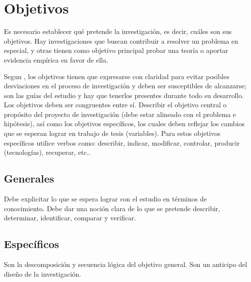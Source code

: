 




\section{Objetivos}
Es necesario establecer qué pretende la investigación, es decir, cuáles son sus objetivos. Hay investigaciones que buscan contribuir a resolver un problema en especial, y otras tienen como objetivo principal probar una teoría o aportar evidencia empírica en favor de ella. \par 
\vskip 0.3cm
Segun \cite{Rojas}, los objetivos tienen que expresarse con claridad para evitar posibles desviaciones en el proceso de investigación y deben ser susceptibles de alcanzarse; son las guías del estudio y hay que tenerlos presentes durante todo su desarrollo. Los objetivos deben ser congruentes entre sí.
\vskip 0.3cm
Describir el objetivo central o propósito del proyecto de investigación (debe estar alineado con el problema e hipótesis), así como los objetivos específicos, los cuales deben reflejar los cambios que se esperan lograr en trabajo de tesis (variables). Para estos objetivos específicos utilice verbos como: describir, indicar, modificar, controlar, producir (tecnologías), recuperar, etc..

\subsection{Generales}
Debe explicitar lo que se espera lograr con el estudio en términos de conocimiento. Debe dar una noción clara de lo que se pretende describir, determinar, identificar, comparar y verificar.


\subsection{Específicos}
Son la descomposición y secuencia lógica del objetivo general. Son un anticipo del diseño de la investigación.
\vskip 0.3cm



